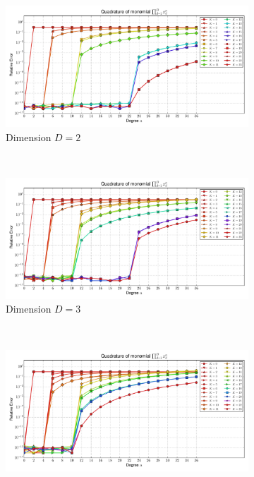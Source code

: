 \documentclass[a4paper,10pt]{article}
\begin{document}
\begin{figure}
  \begin{subfigure}[b]{\linewidth}
    \centering
    \includegraphics[width=\linewidth]{./img/monomial_errors_chebyshevt_multivariate_dimension_2.pdf}
    \caption{Dimension $D=2$}
    \label{fig:monomial_errors_chebyshevt_multivariate_dimension_2}
  \end{subfigure} \\
  \begin{subfigure}[b]{\linewidth}
    \centering
    \includegraphics[width=\linewidth]{./img/monomial_errors_chebyshevt_multivariate_dimension_3.pdf}
    \caption{Dimension $D=3$}
    \label{fig:monomial_errors_chebyshevt_multivariate_dimension_3}
  \end{subfigure} \\
  \begin{subfigure}[b]{\linewidth}
    \centering
    \includegraphics[width=\linewidth]{./img/monomial_errors_chebyshevt_multivariate_dimension_4.pdf}

\end{subfigure}
\end{figure}
\end{document}
